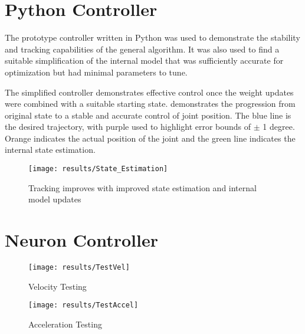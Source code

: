 \section{Python Controller}

The prototype controller written in Python was used to demonstrate the stability
and tracking capabilities of the general algorithm. It was also used to find a
suitable simplification of the internal model that was sufficiently accurate for
optimization but had minimal parameters to tune.



The simplified controller demonstrates effective control once the weight updates
were combined with a suitable starting state. 
demonstrates the progression from original state to a stable and accurate
control of joint position. The blue line is the desired trajectory, with purple
used to highlight error bounds of $\pm$ 1 degree. Orange indicates the actual
position of the joint and the green line indicates the internal state
estimation.

\begin{figure}
\centering
\texttt{[image: results/State\_Estimation]}
\caption{Tracking improves with improved state estimation and internal model
updates}
\label{fig:SimplifiedTracking}
\end{figure}

\section{Neuron Controller}



\begin{figure}
\centering
\texttt{[image: results/TestVel]}
\caption{Velocity Testing}
\label{fig:TestVel}
\end{figure}

\begin{figure}
\centering
\texttt{[image: results/TestAccel]}
\caption{Acceleration Testing}
\label{fig:TestAccel}
\end{figure}

